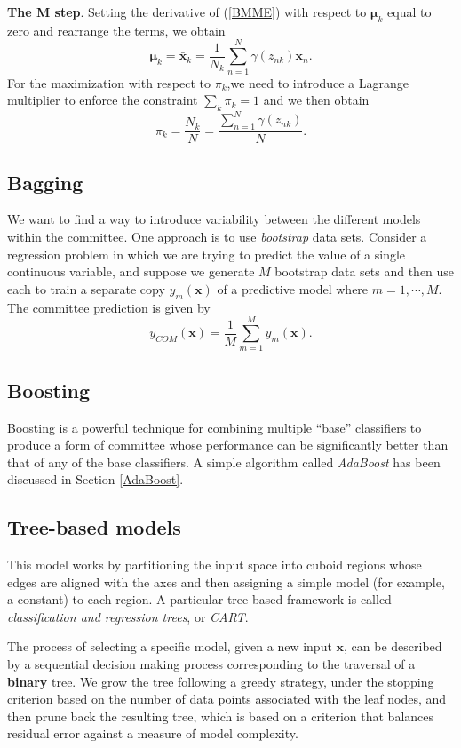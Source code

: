 \documentclass[a4paper]{book}
\renewcommand{\bf}{\mathbf}
\newcommand{\imp}[1]{\textit{#1}}
\newcommand{\bs}{\boldsymbol}
\begin{document}
\textbf{The M step}. Setting the derivative of (\ref{BMME}) with respect to $\bs{\mu}_k$ equal to zero and rearrange the terms, we obtain
\begin{equation}
	\bs{\mu}_k = \bar{\bf{x}}_k = \frac{1}{N_k}\sum_{n=1}^N \gamma(z_{nk}) \bf{x}_n.
\end{equation}
For the maximization with respect to $\pi_k$,we need to introduce a Lagrange multiplier to enforce the constraint $\sum_k \pi_k = 1$ and we then obtain
\begin{equation}
	\pi_k = \frac{N_k}{N} = \frac{\sum_{n=1}^N \gamma(z_{nk})}{N}.
\end{equation}
\subsection{Bagging}
We want to find a way to introduce variability between the different models within the committee. One approach is to use \imp{bootstrap} data sets. Consider a regression problem in which we are trying to predict the value of a single continuous variable, and suppose we generate $M$ bootstrap data sets and then use each to train a separate copy $y_m(\bf{x})$ of a predictive model where $m=1,\cdots,M$. The committee prediction is given by
\begin{equation}
	y_{COM}(\bf{x}) = \frac{1}{M} \sum_{m=1}^M y_m(\bf{x}).
\end{equation}
\subsection{Boosting}
Boosting is a powerful technique for combining multiple ``base'' classifiers to produce a form of committee whose performance can be significantly better than that of any of the base classifiers. A simple algorithm called \imp{AdaBoost} has been discussed in Section \ref{AdaBoost}.
\subsection{Tree-based models}
This model works by partitioning the input space into cuboid regions whose edges are aligned with the axes and then assigning a simple model (for example, a constant) to each region. A particular tree-based framework is called \imp{classification and regression trees}, or \imp{CART}. 

The process of selecting a specific model, given a new input $\bf{x}$, can be described by a sequential decision making process corresponding to the traversal of a \textbf{binary} tree. We grow the tree following a greedy strategy, under the stopping criterion based on the number of data points associated with the leaf nodes, and then prune back the resulting tree, which is based on a criterion that balances residual error against a measure of model complexity.
\end{document}
